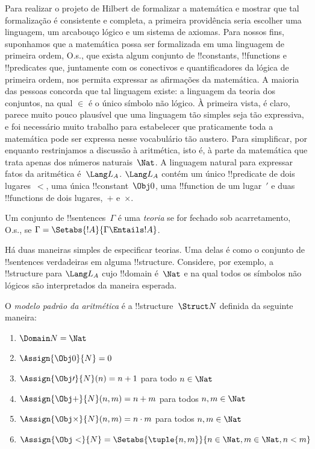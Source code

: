 \documentclass[../../../include/open-logic-section]{subfiles}
\begin{document}


Para realizar o projeto de Hilbert de formalizar a matemática e mostrar
que tal formalização é consistente e completa, a primeira providência
seria escolher uma linguagem, um arcabouço lógico e um sistema de
axiomas. Para nossos fins, suponhamos que a matemática possa ser
formalizada em uma linguagem de primeira ordem, O.s.\@, que exista
algum conjunto de !!{constant}s, !!{function}s e !!{predicate}s que,
juntamente com os conectivos e quantificadores da lógica de primeira
ordem, nos permita expressar as afirmações da matemática. A maioria das
pessoas concorda que tal linguagem existe: a linguagem da teoria dos
conjuntos, na qual $\in$ é o único símbolo não lógico. À primeira
vista, é claro, parece muito pouco plausível que uma linguagem tão
simples seja tão expressiva, e foi necessário muito trabalho para
estabelecer que praticamente toda a matemática pode ser expressa nesse
vocabulário tão austero. Para simplificar, por enquanto restrinjamos a
discussão à aritmética, isto é, à parte da matemática que trata apenas
dos números naturais~$\Nat$. A linguagem natural para expressar fatos
da aritmética é~$\Lang L_A$. $\Lang L_A$ contém um único
!!{predicate} de dois lugares~$<$, uma única !!{constant}~$\Obj 0$,
uma !!{function} de um lugar~$\prime$ e duas !!{function}s de dois
lugares,~$+$ e~$\times$.

\begin{defn}
Um conjunto de !!{sentence}s~$\Gamma$ é uma \emph{teoria} se for
fechado sob acarretamento, O.s.\@, se $\Gamma = \Setabs{!A}{\Gamma
\Entails !A}$.
\end{defn}

Há duas maneiras simples de especificar teorias. Uma delas é como o
conjunto de !!{sentence}s verdadeiras em alguma !!{structure}.
Considere, por exemplo, a !!{structure} para $\Lang L_A$ cujo
!!{domain} é~$\Nat$ e na qual todos os símbolos não lógicos são
interpretados da maneira esperada.

\begin{defn}
O \emph{modelo padrão da aritmética} é a !!{structure}~$\Struct N$
definida da seguinte maneira:
\begin{enumerate}
\item $\Domain N = \Nat$
\item $\Assign{\Obj 0}{N} = 0$
\item $\Assign{\Obj \prime}{N}(n) = n + 1$ para todo $n \in \Nat$
\item $\Assign{\Obj +}{N}(n, m) = n + m$ para todos $n, m \in \Nat$
\item $\Assign{\Obj \times}{N}(n, m) = n\cdot m$ para todos $n, m \in \Nat$
\item $\Assign{\Obj <}{N} = \Setabs{\tuple{n, m}}{n \in \Nat, m \in
  \Nat, n < m}$
\end{enumerate}
\end{defn}
\end{document}
